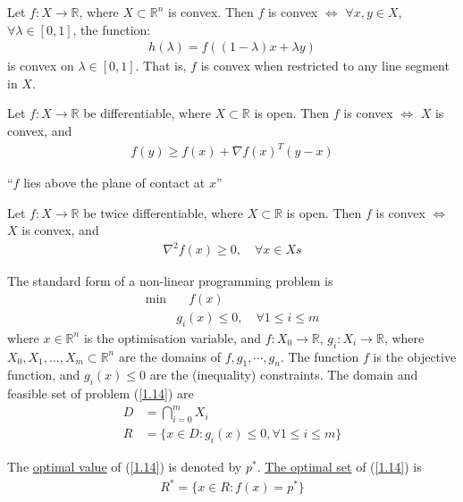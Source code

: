 \begin{theorem}
    Let $f: X\to\mathbb{R}$, where $X\subset \mathbb{R}^n$ is convex. Then $f$ is convex $\Longleftrightarrow$ $\forall x, y\in X$, $\forall \lambda\in[0, 1]$, the function:
    \begin{align*}
        h(\lambda) = f\left((1-\lambda)x + \lambda y \right)
    \end{align*}
    is convex on $\lambda\in[0, 1]$. That is, $f$ is convex when restricted to any line segment in $X$.
\end{theorem}

\begin{theorem}
    Let $f: X\to \mathbb{R}$ be differentiable, where $X\subset\mathbb{R}$ is open. Then $f$ is convex $\Longleftrightarrow$ $X$ is convex, and
    \begin{align*}
        f(y) \ge f(x) + \nabla f(x)^T(y-x)
    \end{align*}

    ``$f$ lies above the plane of contact at $x$''
\end{theorem}

\begin{theorem}
    Let $f:X\to\mathbb{R}$ be twice differentiable, where $X\subset \mathbb{R}$ is open. Then $f$ is convex $\Longleftrightarrow$ $X$ is convex, and 
    \begin{align*}
        \nabla^2 f(x) \ge 0, \quad \forall x\in Xs
    \end{align*}
\end{theorem}

The standard form of a non-linear programming problem is
\begin{align}
    \min &\quad f(x) \nonumber\\
    & g_i(x) \leqslant 0, \quad \forall 1 \leqslant i \leqslant m \label{1.14}
\end{align}
where $x \in \mathbb{R}^n$ is the optimisation variable, and $f: X_0 \rightarrow \mathbb{R}$, $g_i: X_i \rightarrow \mathbb{R}$, where $X_0, X_1, \ldots, X_m \subset \mathbb{R}^n$ are the domains of $f, g_1, \cdots, g_n$. The function $f$ is the objective function, and $g_i(x)\le 0$ are the (inequality) constraints. The domain and feasible set of problem (\ref{1.14}) are
\begin{align*}
    D& = \bigcap\limits_{i=0}^m X_i \\
    R &= \{x\in D: g_i(x)\le 0, \forall 1\le i\le m \}
\end{align*}

The \underline{optimal value} of (\ref{1.14}) is denoted by $p^*$. \underline{The optimal set} of (\ref{1.14}) is
\begin{align*}
    R^* = \{ x\in R: f(x) = p^*\}
\end{align*}

